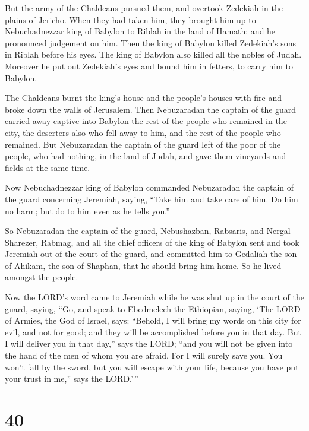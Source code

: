  But the army of the Chaldeans pursued them, and overtook
Zedekiah in the plains of Jericho. When they had taken him, they brought
him up to Nebuchadnezzar king of Babylon to Riblah in the land of
Hamath; and he pronounced judgement on him.  Then the king
of Babylon killed Zedekiah's sons in Riblah before his eyes. The king of
Babylon also killed all the nobles of Judah.  Moreover he
put out Zedekiah's eyes and bound him in fetters, to carry him to
Babylon.

 The Chaldeans burnt the king's house and the people's
houses with fire and broke down the walls of Jerusalem. 
Then Nebuzaradan the captain of the guard carried away captive into
Babylon the rest of the people who remained in the city, the deserters
also who fell away to him, and the rest of the people who remained.
 But Nebuzaradan the captain of the guard left of the
poor of the people, who had nothing, in the land of Judah, and gave them
vineyards and fields at the same time.

 Now Nebuchadnezzar king of Babylon commanded Nebuzaradan
the captain of the guard concerning Jeremiah, saying, 
``Take him and take care of him. Do him no harm; but do to him even as
he tells you.''

 So Nebuzaradan the captain of the guard, Nebushazban,
Rabsaris, and Nergal Sharezer, Rabmag, and all the chief officers of the
king of Babylon  sent and took Jeremiah out of the court
of the guard, and committed him to Gedaliah the son of Ahikam, the son
of Shaphan, that he should bring him home. So he lived amongst the
people.

 Now the LORD's word came to Jeremiah while he was shut
up in the court of the guard, saying,  ``Go, and speak to
Ebedmelech the Ethiopian, saying, `The LORD of Armies, the God of
Israel, says: ``Behold, I will bring my words on this city for evil, and
not for good; and they will be accomplished before you in that day.
 But I will deliver you in that day,'' says the LORD;
``and you will not be given into the hand of the men of whom you are
afraid.  For I will surely save you. You won't fall by
the sword, but you will escape with your life, because you have put your
trust in me,'' says the LORD.'\,''

\hypertarget{section-39}{%
\section{40}\label{section-39}}

